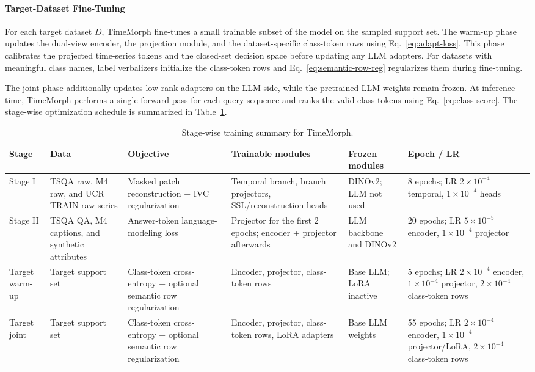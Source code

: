 \documentclass[10pt,journal,compsoc]{IEEEtran}
\begin{document}
\paragraph{Target-Dataset Fine-Tuning}

For each target dataset $D$, TimeMorph fine-tunes a small trainable subset of the model on the sampled support set.
The warm-up phase updates the dual-view encoder, the projection module, and the dataset-specific class-token rows using Eq.~\eqref{eq:adapt-loss}.
This phase calibrates the projected time-series tokens and the closed-set decision space before updating any LLM adapters.
For datasets with meaningful class names, label verbalizers initialize the class-token rows and Eq.~\eqref{eq:semantic-row-reg} regularizes them during fine-tuning.

The joint phase additionally updates low-rank adapters on the LLM side, while the pretrained LLM weights remain frozen.
At inference time, TimeMorph performs a single forward pass for each query sequence and ranks the valid class tokens using Eq.~\eqref{eq:class-score}.
The stage-wise optimization schedule is summarized in Table~\ref{tab:stage-wise-training}.

\begin{table}[t]
\centering
\caption{Stage-wise training summary for TimeMorph.}
\label{tab:stage-wise-training}
\scriptsize
\setlength{\tabcolsep}{1.6pt}
\renewcommand{\arraystretch}{1.08}
\begin{tabular}{@{}p{}p{}p{}p{}p{}p{}@{}}
\toprule
\textbf{Stage} & \textbf{Data} & \textbf{Objective} & \textbf{Trainable modules} & \textbf{Frozen modules} & \textbf{Epoch / LR} \\
\midrule
Stage I & TSQA raw, M4 raw, and UCR TRAIN raw series &
Masked patch reconstruction + IVC regularization &
Temporal branch, branch projectors, SSL/reconstruction heads &
DINOv2; LLM not used &
8 epochs; LR $2\times10^{-4}$ temporal, $1\times10^{-4}$ heads \\
\midrule
Stage II & TSQA QA, M4 captions, and synthetic attributes &
Answer-token language-modeling loss &
Projector for the first 2 epochs; encoder + projector afterwards &
LLM backbone and DINOv2 &
20 epochs; LR $5\times10^{-5}$ encoder, $1\times10^{-4}$ projector \\
\midrule
Target warm-up & Target support set &
Class-token cross-entropy + optional semantic row regularization &
Encoder, projector, class-token rows &
Base LLM; LoRA inactive &
5 epochs; LR $2\times10^{-4}$ encoder, $1\times10^{-4}$ projector, $2\times10^{-4}$ class-token rows \\
\midrule
Target joint & Target support set &
Class-token cross-entropy + optional semantic row regularization &
Encoder, projector, class-token rows, LoRA adapters &
Base LLM weights &
55 epochs; LR $2\times10^{-4}$ encoder, $1\times10^{-4}$ projector/LoRA, $2\times10^{-4}$ class-token rows \\
\bottomrule
\end{tabular}
\end{table}
\end{document}

